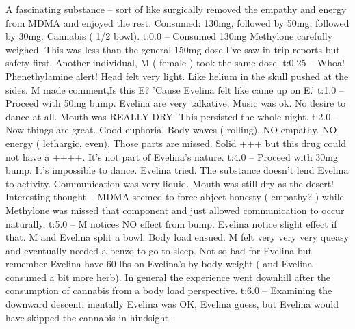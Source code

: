 \documentclass[12pt]{book}
\begin{document}
A fascinating substance -- sort of like surgically removed the empathy and energy from MDMA and enjoyed the rest. Consumed: 130mg, followed by 50mg, followed by 30mg. Cannabis ( 1/2 bowl). t:0.0 -- Consumed 130mg Methylone carefully weighed. This was less than the general 150mg dose I've saw in trip reports but safety first. Another individual, M ( female ) took the same dose. t:0.25 -- Whoa! Phenethylamine alert! Head felt very light. Like helium in the skull pushed at the sides. M made comment,Is this E? 'Cause Evelina felt like came up on E.' t:1.0 -- Proceed with 50mg bump. Evelina are very talkative. Music was ok. No desire to dance at all. Mouth was REALLY DRY. This persisted the whole night. t:2.0 -- Now things are great. Good euphoria. Body waves ( rolling). NO empathy. NO energy ( lethargic, even). Those parts are missed. Solid +++ but this drug could not have a ++++. It's not part of Evelina's nature. t:4.0 -- Proceed with 30mg bump. It's impossible to dance. Evelina tried. The substance doesn't lend Evelina to activity. Communication was very liquid. Mouth was still dry as the desert! Interesting thought -- MDMA seemed to force abject honesty ( empathy? ) while Methylone was missed that component and just allowed communication to occur naturally. t:5.0 -- M notices NO effect from bump. Evelina notice slight effect if that. M and Evelina split a bowl. Body load ensued. M felt very very very queasy and eventually needed a benzo to go to sleep. Not so bad for Evelina but remember Evelina have 60 lbs on Evelina's by body weight ( and Evelina consumed a bit more herb). In general the experience went downhill after the consumption of cannabis from a body load perspective. t:6.0 -- Examining the downward descent: mentally Evelina was OK, Evelina guess, but Evelina would have skipped the cannabis in hindsight.
\end{document}
